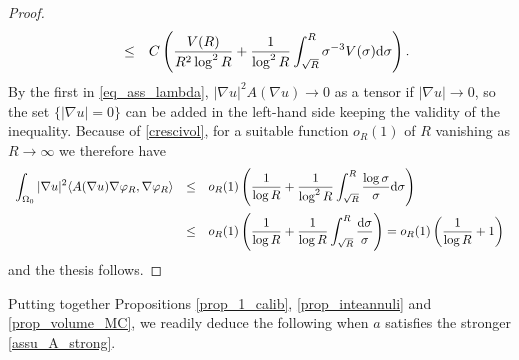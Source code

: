\documentclass[10 pt,a4paper]{article}
\theoremstyle{definition}
\begin{document}
\begin{proof}
$$\begin{array}{lcl}
		& \le & \displaystyle C\left( \frac{V(R)}{R^2\log^2R} + \frac{1}{\log^2 R}\int_{\sqrt{R}}^R \sigma^{-3} V(\sigma) \mathrm{d} \sigma\right).
	\end{array}
	$$
	By the first in \eqref{eq_ass_lambda}, $|\nabla u|^2 A(\nabla u) \to 0$ as a tensor if $|\nabla u| \to 0$, so the set $\{|\nabla u|=0\}$ can be added in the left-hand side keeping the validity of the inequality. Because of \eqref{crescivol}, for a suitable function $o_R(1)$ of $R$ vanishing as $R \to \infty$ we therefore have 
	$$
	\begin{array}{lcl}
		\displaystyle \int_{\Omega_0} |\nabla u|^2 \langle A(\nabla u) \nabla \varphi_R, \nabla \varphi_R \rangle & \le & \displaystyle o_R(1) \left( \frac{1}{\log R} + \frac{1}{\log^2 R}\int_{\sqrt{R}}^R \frac{\log \sigma}{\sigma}\mathrm{d} \sigma\right) \\[0.5cm]
		& \le & \displaystyle o_R(1) \left( \frac{1}{\log R} + \frac{1}{\log R}\int_{\sqrt{R}}^R \frac{\mathrm{d} \sigma}{\sigma}\right) = o_R(1) \left(\frac{1}{\log R}+ 1\right)
	\end{array}
	$$
	and the thesis follows.
\end{proof}

Putting together Propositions \ref{prop_1_calib}, \ref{prop_inteannuli} and \ref{prop_volume_MC}, we readily deduce the following when $a$ satisfies the stronger \eqref{assu_A_strong}.
\end{document}
